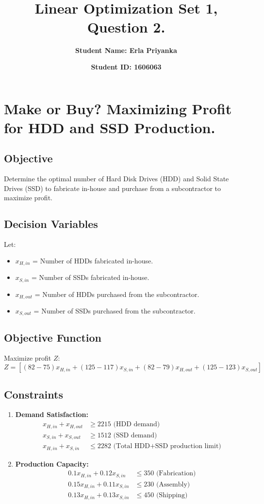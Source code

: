 \documentclass[10pt]{article}
\title{\textbf{Linear Optimization Set 1, Question 2.}}
\author{\textbf{Student Name: Erla Priyanka}}
\date{\textbf{Student ID: 1606063}}
\begin{document}
\maketitle


\section*{ Make or Buy? Maximizing Profit for HDD and SSD Production.}

\subsection*{Objective}
Determine the optimal number of Hard Disk Drives (HDD) and Solid State Drives (SSD) to fabricate in-house and purchase from a subcontractor to maximize profit.

\subsection*{Decision Variables}
Let:
\begin{itemize}
    \item \( x_{H,in} \) = Number of HDDs fabricated in-house.
    \item \( x_{S,in} \) = Number of SSDs fabricated in-house.
    \item \( x_{H,out} \) = Number of HDDs purchased from the subcontractor.
    \item \( x_{S,out} \) = Number of SSDs purchased from the subcontractor.
\end{itemize}

\subsection*{Objective Function}
Maximize profit \( Z \):
\[
Z = [(82 - 75)x_{H,in} + (125 - 117)x_{S,in} + (82 - 79)x_{H,out} + (125 - 123)x_{S,out}]
\]

\subsection*{Constraints}

\begin{enumerate}
    \item \textbf{Demand Satisfaction:}
    \begin{align*}
    x_{H,in} + x_{H,out} &\geq 2215 \text{ (HDD demand)} \\
    x_{S,in} + x_{S,out} &\geq 1512 \text{ (SSD demand)} \\
    x_{H,in} + x_{S,in} &\leq 2282 \text{ (Total HDD+SSD production limit)}
    \end{align*}
    
    \item \textbf{Production Capacity:}
    \begin{align*}
    0.1x_{H,in} + 0.12x_{S,in} &\leq 350 \text{ (Fabrication)} \\
    0.15x_{H,in} + 0.11x_{S,in} &\leq 230 \text{ (Assembly)} \\
    0.13x_{H,in} + 0.13x_{S,in} &\leq 450 \text{ (Shipping)}
    \end{align*}
\end{enumerate}
\end{document}
